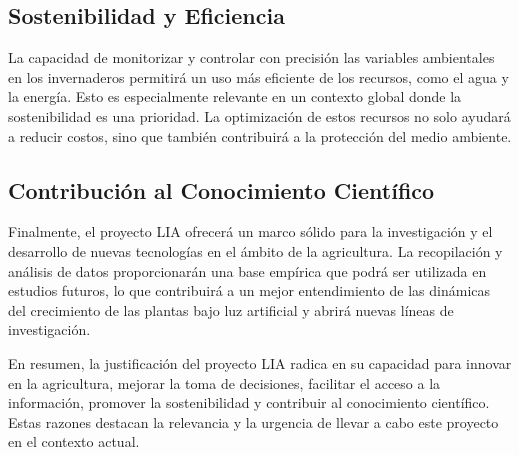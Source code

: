 \subsection{Sostenibilidad y Eficiencia}
La capacidad de monitorizar y controlar con precisión las variables ambientales en los invernaderos permitirá un uso más eficiente de los recursos, como el agua y la energía. Esto es especialmente relevante en un contexto global donde la sostenibilidad es una prioridad. La optimización de estos recursos no solo ayudará a reducir costos, sino que también contribuirá a la protección del medio ambiente.

\subsection{Contribución al Conocimiento Científico}
Finalmente, el proyecto LIA ofrecerá un marco sólido para la investigación y el desarrollo de nuevas tecnologías en el ámbito de la agricultura. La recopilación y análisis de datos proporcionarán una base empírica que podrá ser utilizada en estudios futuros, lo que contribuirá a un mejor entendimiento de las dinámicas del crecimiento de las plantas bajo luz artificial y abrirá nuevas líneas de investigación.

En resumen, la justificación del proyecto LIA radica en su capacidad para innovar en la agricultura, mejorar la toma de decisiones, facilitar el acceso a la información, promover la sostenibilidad y contribuir al conocimiento científico. Estas razones destacan la relevancia y la urgencia de llevar a cabo este proyecto en el contexto actual.